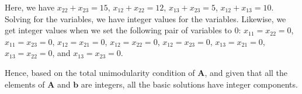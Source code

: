 \documentclass[letter,12pt]{article}
\begin{document}
Here, we have $x_{22} + x_{23} = 15$, $x_{12} + x_{22} = 12$, $x_{13} + x_{23} = 5$, $x_{12} + x_{13} = 10$. Solving for the variables, we have integer values for the variables. Likewise, we get integer values when we set the following pair of variables to 0: $x_{11} = x_{22} = 0$, $x_{11} = x_{23} = 0$, $x_{12} = x_{21} = 0$, $x_{12} = x_{22} = 0$, $x_{12} = x_{23} = 0$, $x_{13} = x_{21} = 0$, $x_{13} = x_{22} = 0$, and $x_{13} = x_{23} = 0$.






















%	








Hence, based on the total unimodularity condition of $\mathbf{A}$, and given that all the elements of $\mathbf{A}$ and $\mathbf{b}$ are integers, all the basic solutions have integer components.
\end{document}
